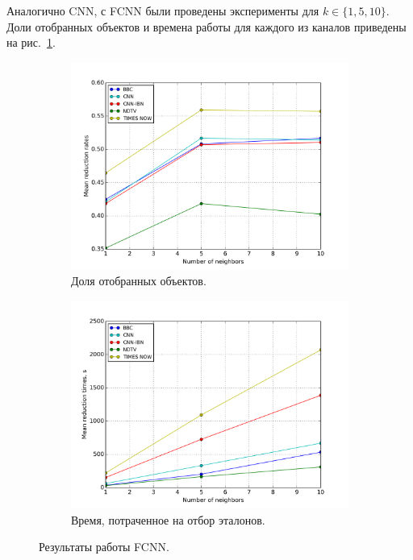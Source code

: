 Аналогично CNN, с FCNN были проведены эксперименты для \(k\in\{1,5,10\}\). Доли отобранных объектов и времена работы для каждого из каналов приведены на рис.~\ref{fig:fcnn-stats}.
\begin{figure}[h!]
    \centering
	\begin{subfigure}{0.45\textwidth}
		\includegraphics[width=\textwidth]{images/fcnn-stats.png}
		\caption{Доля отобранных объектов.}
	\end{subfigure}
	\begin{subfigure}{0.45\textwidth}
		\includegraphics[width=\textwidth]{images/fcnn-TimeStats.png}
		\caption{Время, потраченное на отбор эталонов.}
	\end{subfigure}
	\caption{Результаты работы FCNN.}\label{fig:fcnn-stats}
\end{figure}


